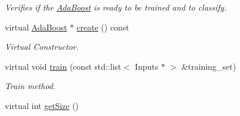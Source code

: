 \begin{DoxyCompactItemize}
\begin{DoxyCompactList}\small\item\em Verifies if the \hyperlink{classiCub_1_1boostMIL_1_1AdaBoost}{Ada\+Boost} is ready to be trained and to classify. \end{DoxyCompactList}\item 
virtual \hyperlink{classiCub_1_1boostMIL_1_1AdaBoost}{Ada\+Boost} $\ast$ \hyperlink{classiCub_1_1boostMIL_1_1AdaBoost_a45a76816e16f1ba1c4fee8cda9775fff}{create} () const 
\begin{DoxyCompactList}\small\item\em Virtual Constructor. \end{DoxyCompactList}\item 
virtual void \hyperlink{classiCub_1_1boostMIL_1_1AdaBoost_a76ba0d64fce413e160cd069175e44819}{train} (const std\+::list$<$ Inputs $\ast$ $>$ \&training\+\_\+set)
\begin{DoxyCompactList}\small\item\em Train method. \end{DoxyCompactList}\item 
virtual int \hyperlink{classiCub_1_1boostMIL_1_1StrongClassifier_a99285415c37a3f1271c8afb2b5e3ae94}{get\+Size} ()\label{classiCub_1_1boostMIL_1_1StrongClassifier_a99285415c37a3f1271c8afb2b5e3ae94}


\end{DoxyCompactItemize}
